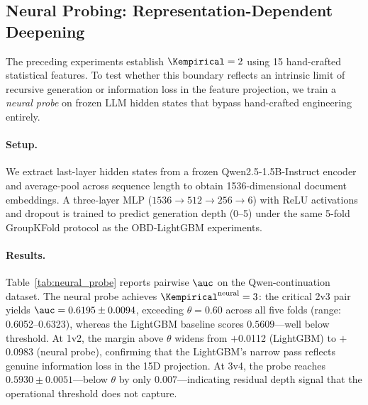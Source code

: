 
\subsection{Neural Probing: Representation-Dependent Deepening}
\label{sec:neural_probe}

The preceding experiments establish $\Kempirical = 2$ using 15 hand-crafted statistical features.
To test whether this boundary reflects an intrinsic limit of recursive generation or information loss in the feature projection, we train a \emph{neural probe} on frozen LLM hidden states that bypass hand-crafted engineering entirely.

\paragraph{Setup.}
We extract last-layer hidden states from a frozen Qwen2.5-1.5B-Instruct encoder and average-pool across sequence length to obtain 1536-dimensional document embeddings.
A three-layer MLP ($1536 \to 512 \to 256 \to 6$) with ReLU activations and dropout is trained to predict generation depth (0--5) under the same 5-fold GroupKFold protocol as the OBD-LightGBM experiments.

\paragraph{Results.}
Table~\ref{tab:neural_probe} reports pairwise $\auc$ on the Qwen-continuation dataset.%
The neural probe achieves $\Kempirical^{\text{neural}} = 3$: the critical 2v3 pair yields $\auc = 0.6195 \pm 0.0094$, exceeding $\theta = 0.60$ across all five folds (range: 0.6052--0.6323), whereas the LightGBM baseline scores $0.5609$---well below threshold.%
At 1v2, the margin above $\theta$ widens from $+$0.0112 (LightGBM) to $+$0.0983 (neural probe), confirming that the LightGBM's narrow pass reflects genuine information loss in the 15D projection.%
At 3v4, the probe reaches $0.5930 \pm 0.0051$---below $\theta$ by only 0.007---indicating residual depth signal that the operational threshold does not capture.%


